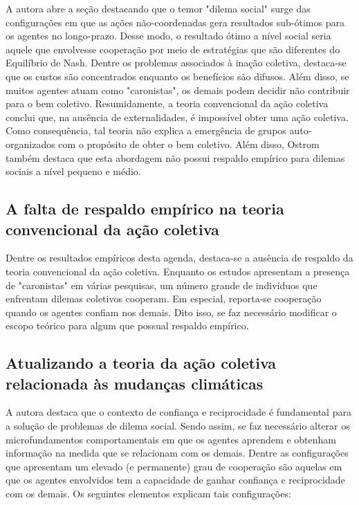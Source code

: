 \documentclass[11pt]{article}
\begin{document}
A autora abre a seção destacando que o temor "dilema social" surge das configurações em que as ações não-coordenadas gera resultados sub-ótimos para os agentes no longo-prazo.
Desse modo, o resultado ótimo a nível social seria aquele que envolvesse cooperação por meio de estratégias que são diferentes do Equilíbrio de Nash.
Dentre os problemas associados à inação coletiva, destaca-se que os custos são concentrados enquanto os benefícios são difusos.
Além disso, se muitos agentes atuam como "caronistas", os demais podem decidir não contribuir para o bem coletivo.
Resumidamente, a teoria convencional da ação coletiva conclui que, na ausência de externalidades, é impossível obter uma ação coletiva.
Como consequência, tal teoria não explica a emergência de grupos auto-organizados  com o propósito de obter o bem coletivo.
Além disso, Ostrom também destaca que esta abordagem não possui respaldo empírico para dilemas sociais a nível pequeno e médio.

\subsection{A falta de respaldo empírico na teoria convencional da ação coletiva}
\label{sec:orge831dc6}

Dentre os resultados empíricos desta agenda, destaca-se a ausência de respaldo da teoria convencional da ação coletiva.
Enquanto os estudos apresentam a presença de "caronistas" em várias pesquisas, um número grande de indivíduos que enfrentam dilemas coletivos cooperam.
Em especial, reporta-se cooperação quando os agentes confiam nos demais.
Dito isso, se faz necessário modificar o escopo teórico para algum que possual respaldo empírico.

\subsection{Atualizando a teoria da ação coletiva relacionada às mudanças climáticas}
\label{sec:orgf7554d5}

A autora destaca que o contexto de confiança e reciprocidade é fundamental para a solução de problemas de dilema social.
Sendo assim, se faz necessário alterar os microfundamentos comportamentais em que os agentes aprendem e obtenham informação na medida que se relacionam com os demais.
Dentre as configurações que apresentam um elevado (e permanente) grau de cooperação são aquelas em que os agentes envolvidos tem a capacidade de ganhar confiança e reciprocidade com os demais.
Os seguintes elementos explicam tais configurações:
\end{document}
